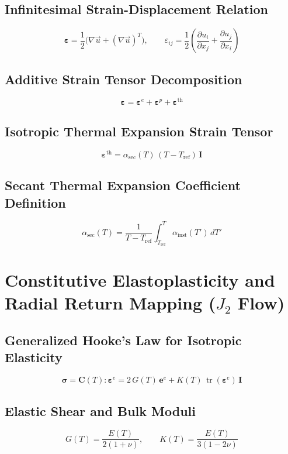 \documentclass[10pt,a4paper]{article}
\begin{document}
\subsection*{Infinitesimal Strain-Displacement Relation}
\[
\boldsymbol{\varepsilon} = \frac{1}{2}\bigl(\nabla \vec{u} + (\nabla \vec{u})^T\bigr), \qquad \varepsilon_{ij} = \frac{1}{2}\left(\frac{\partial u_i}{\partial x_j} + \frac{\partial u_j}{\partial x_i}\right)
\]

\subsection*{Additive Strain Tensor Decomposition}
\[
\boldsymbol{\varepsilon} = \boldsymbol{\varepsilon}^e + \boldsymbol{\varepsilon}^p + \boldsymbol{\varepsilon}^{\mathrm{th}}
\]

\subsection*{Isotropic Thermal Expansion Strain Tensor}
\[
\boldsymbol{\varepsilon}^{\mathrm{th}} = \alpha_{\mathrm{sec}}(T)\,(T - T_{\mathrm{ref}})\,\mathbf{I}
\]

\subsection*{Secant Thermal Expansion Coefficient Definition}
\[
\alpha_{\mathrm{sec}}(T) = \frac{1}{T - T_{\mathrm{ref}}}\int_{T_{\mathrm{ref}}}^{T} \alpha_{\mathrm{inst}}(T')\,dT'
\]

\clearpage
\section{Constitutive Elastoplasticity and Radial Return Mapping (\texorpdfstring{$J_2$}{J2} Flow)}

\subsection*{Generalized Hooke's Law for Isotropic Elasticity}
\[
\boldsymbol{\sigma} = \mathbf{C}(T) : \boldsymbol{\varepsilon}^e = 2\,G(T)\,\mathbf{e}^e + K(T)\,\operatorname{tr}(\boldsymbol{\varepsilon}^e)\,\mathbf{I}
\]

\subsection*{Elastic Shear and Bulk Moduli}
\[
G(T) = \frac{E(T)}{2(1 + \nu)}, \qquad K(T) = \frac{E(T)}{3(1 - 2\nu)}
\]
\end{document}
